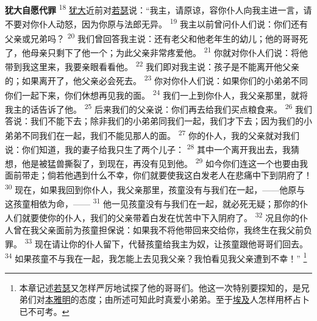 \textbf{犹大自愿代罪 }
\textsuperscript{18}
\uline{犹大}近前对\uline{若瑟}说：“我主，请原谅，容你仆人向我主进一言，请不要对你仆人动怒，因为你原与法郎无异。
\textsuperscript{19}
我主以前曾问仆人们说：你们还有父亲或兄弟吗？
\textsuperscript{20}
我们曾回答我主说：还有老父和他老年生的幼儿；他的哥哥死了，他母亲只剩下了他一个；为此父亲非常疼爱他。
\textsuperscript{21}
你就对你仆人们说：将他带到我这里来，我要亲眼看看他。
\textsuperscript{22}
我们即对我主说：孩子是不能离开他父亲的；如果离开了，他父亲必会死去。
\textsuperscript{23}
你对你仆人们说：如果你们的小弟弟不同你们一起下来，你们休想再见我的面。
\textsuperscript{24}
我们一上到你仆人，我父亲那里，就将我主的话告诉了他。
\textsuperscript{25}
后来我们的父亲说：你们再去给我们买点粮食来。
\textsuperscript{26}
我们答说：我们不能下去；除非我们的小弟弟同我们一起，我们才下去；因为我们的小弟弟不同我们在一起，我们不能见那人的面。
\textsuperscript{27}
你的仆人，我的父亲就对我们说：你们知道，我的妻子给我只生了两个儿子：
\textsuperscript{28}
其中一个离开我出去，我猜想，他是被猛兽撕裂了，到现在，再没有见到他。
\textsuperscript{29}
如今你们连这一个也要由我面前带走；倘若他遇到什么不幸，你们就要使我这白发老人在悲痛中下到阴府了！
\textsuperscript{30}
现在，如果我回到你仆人，我父亲那里，孩童没有与我们在一起，——他原与这孩童相依为命，——
\textsuperscript{31}
他一见孩童没有与我们在一起，就必死无疑；那你的仆人们就要使你的仆人，我们的父亲带着白发在忧苦中下入阴府了。
\textsuperscript{32}
况且你的仆人曾在我父亲面前为孩童担保说：如果我不将他带回来交给你，我终生在我父前负罪。
\textsuperscript{33}
现在请让你的仆人留下，代替孩童给我主为奴，让孩童跟他哥哥们回去。
\textsuperscript{34}
如果孩童不与我在一起，我怎能上去见我父亲？我怕看见我父亲遭到不幸！”
\footnote{本章记述\uline{若瑟}又怎样严厉地试探了他的哥哥们。他这一次特别要探知的，是兄弟们对\uline{本雅明}的态度；由所述可知此时真爱小弟弟。至于\uline{埃及}人怎样用杯占卜已不可考。}

